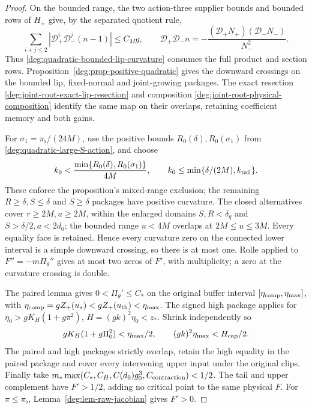 \begin{proof}
On the bounded range, the two action-three supplier bounds and
bounded rows of \(H_\pm\) give, by the separated quotient rule,
\begin{equation}\label{deg:quadratic-bounded-product-rows}
 \sum_{i+j\le2}|\mathcal D_+^i\mathcal D_-^j(n-1)|\le C_Mg,
 \qquad \mathcal D_+\mathcal D_-n
       =-\frac{(\mathcal D_+N_+)(\mathcal D_-N_-)}{N_-^2}.
\end{equation}
Thus \eqref{deg:quadratic-bounded-lip-curvature} consumes the full
product and section rows. Proposition~\ref{deg:prop-positive-quadratic}
gives the downward crossings on the bounded lip, fixed-normal and
joint-growing packages. The exact resection
\eqref{deg:joint-root-exact-lip-resection} and composition
\eqref{deg:joint-root-physical-composition} identify the same map
on their overlaps, retaining coefficient memory and both gains.

For \(\sigma_1=\pi_\flat/(24M)\), use the positive bounds
\(R_0(\delta),R_0(\sigma_1)\) from
\eqref{deg:quadratic-large-S-action}, and choose
\[
 k_0<\frac{\min\{R_0(\delta),R_0(\sigma_1)\}}{4M},\qquad
 k_0\le\min\{\delta/(2M),k_{\rm tail}\}.
\]
These enforce the proposition's mixed-range exclusion; the remaining
\(R\ge\delta,S\le\delta\) and \(S\ge\delta\) packages have positive
curvature. The closed alternatives cover \(r\ge2M,u\ge2M\),
within the enlarged domains \(S,R<\delta_q\) and
\(S>\delta/2,a<2d_0\); the bounded range \(u<4M\) overlaps at
\(2M\le u\le3M\). Every equality face is retained.
Hence every curvature zero on the connected lower interval is a
simple downward crossing, so there is at most one. Rolle applied
to \(F''=-m\Pi_\theta''\) gives at most two zeros of \(F'\),
with multiplicity; a zero at the curvature crossing is double.

The paired lemma gives \(0<\Pi_\theta'\le C_*\) on the original
buffer interval \([\eta_{\rm comp},\eta_{\max}]\), with
\(\eta_{\rm comp}=gZ_+(u_*)<gZ_+(u_{\rm th})<\eta_{\max}\).
The signed high package applies for
\(\eta_0>gK_H(1+g\pi^2)\), \(H=(gk)^2\eta_0<z_*\).
Shrink independently so
\[
 gK_H(1+g\Pi_0^2)<\eta_{\max}/2,\qquad
 (gk)^2\eta_{\max}<H_{\rm cap}/2.
\]
The paired and high packages strictly overlap, retain the high equality
in the paired package and cover every intervening upper input under
the original clips. Finally take
\(m_*\max(C_*,C_H,C(d_0)g_0^3,C_{\rm contraction})<1/2\).
The tail and upper complement have \(F'>1/2\), adding no critical
point to the same physical \(F\). For \(\pi\le\pi_\flat\),
Lemma~\ref{deg:lem-raw-jacobian} gives \(F'>0\).
\end{proof}
